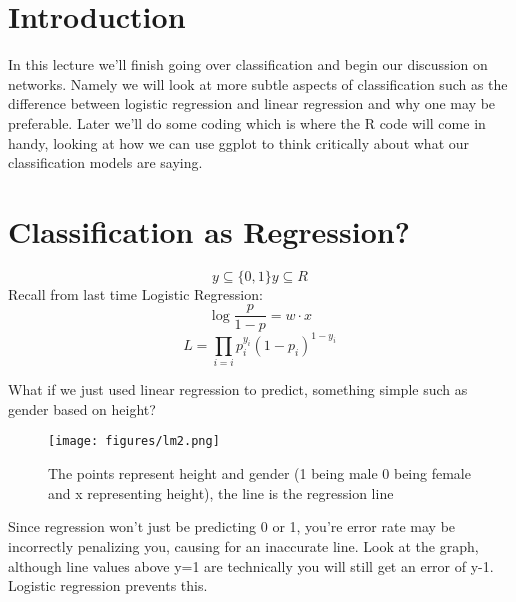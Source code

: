 
\section{Introduction}
In  this lecture we'll finish going over classification and begin our discussion on networks. Namely we will look at more subtle aspects of classification such as the difference between logistic regression and linear regression and why one may be preferable. Later we'll do some coding which is where the R code will come in handy, looking at how we can use ggplot to think critically about what our classification models are saying. 

\section{Classification as Regression?}
\begin{equation}
   y\subseteq \{0,1\} y\subseteq R 
\end{equation}
Recall from last time Logistic Regression: 
\begin{equation}
    \log\frac{p}{1-p}=w\cdot x
\end{equation}
\begin{equation}
    L=\prod_{i=i} p_i^{y_i}(1-p_i)^{1-y_i}
\end{equation}

What if we just used linear regression to predict, something simple such as gender based on height? 
\begin{figure}[ht]
  \begin{center}
 \texttt{[image: figures/lm2.png]}
 \caption{The points represent height and gender (1 being male 0 being female and x representing height), the line is the regression line}
 \end{center}
 \end{figure}
 
 Since regression won't just be predicting 0 or 1, you're error rate may be incorrectly penalizing you, causing for an inaccurate line. Look at the graph, although line  values above y=1 are technically you will still get an error of y-1. Logistic regression prevents this. 


